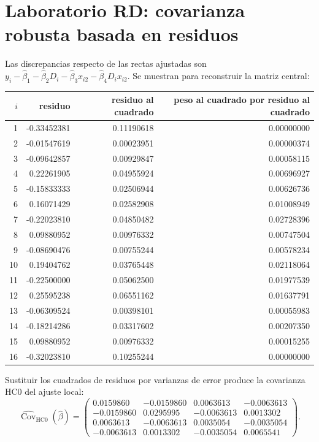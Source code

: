 \documentclass[11pt,a4paper]{article}
\DeclareMathOperator{\Cov}{Cov}
\begin{document}
\section{Laboratorio RD: covarianza robusta basada en residuos}\label{unidad56}
Las discrepancias respecto de las rectas ajustadas son
\(y_i-\widehat\beta_1-\widehat\beta_2D_i
-\widehat\beta_3x_{i2}-\widehat\beta_4D_ix_{i2}\).
Se muestran para reconstruir la matriz central:
\begin{center}\small\begin{tabular}{rrrr}\toprule
\(i\)&residuo&residuo al cuadrado&peso al cuadrado por residuo al cuadrado\\\midrule
1&-0.33452381&0.11190618&0.00000000\\
2&-0.01547619&0.00023951&0.00000374\\
3&-0.09642857&0.00929847&0.00058115\\
4&0.22261905&0.04955924&0.00696927\\
5&-0.15833333&0.02506944&0.00626736\\
6&0.16071429&0.02582908&0.01008949\\
7&-0.22023810&0.04850482&0.02728396\\
8&0.09880952&0.00976332&0.00747504\\
9&-0.08690476&0.00755244&0.00578234\\
10&0.19404762&0.03765448&0.02118064\\
11&-0.22500000&0.05062500&0.01977539\\
12&0.25595238&0.06551162&0.01637791\\
13&-0.06309524&0.00398101&0.00055983\\
14&-0.18214286&0.03317602&0.00207350\\
15&0.09880952&0.00976332&0.00015255\\
16&-0.32023810&0.10255244&0.00000000\\\bottomrule\end{tabular}\end{center}
Sustituir los cuadrados de residuos
por varianzas de error produce
la covarianza HC0 del ajuste local:
\[
\widehat{\Cov}_{\mathrm{HC0}}(\widehat\beta)
=\begin{pmatrix}0.0159860&-0.0159860&0.0063613&-0.0063613\\-0.0159860&0.0295995&-0.0063613&0.0013302\\0.0063613&-0.0063613&0.0035054&-0.0035054\\-0.0063613&0.0013302&-0.0035054&0.0065541\end{pmatrix}.
\]
\end{document}
